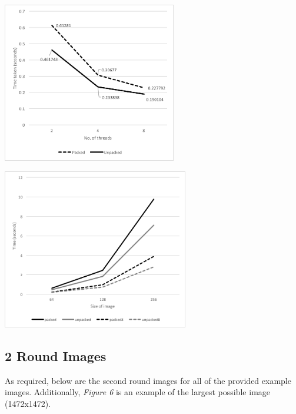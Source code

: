 \documentclass[11pt, oneside]{article}
\newenvironment{Figure}
  {\par\medskip\noindent\minipage{\linewidth}}
  {\endminipage\par\medskip}
\begin{document}
\begin{multicols}{2}

\begin{Figure}
\includegraphics[height=7cm]{images/64x64graph.png}
\end{Figure}

\begin{Figure}
\includegraphics[height=7cm]{images/graph1.png}
\end{Figure}

\end{multicols}


\subsection{2 Round Images}
As required, below are the second round images for all of the provided example images. Additionally, \emph{Figure 6} is an example of the largest possible image (1472x1472).
\end{document}
